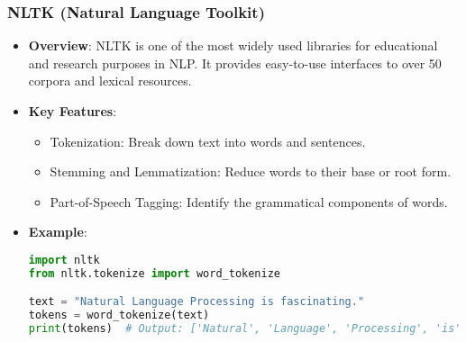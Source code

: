 \documentclass[aspectratio=169]{beamer}
\begin{document}
\begin{frame}[fragile]
    \frametitle{NLTK (Natural Language Toolkit)}
    \begin{itemize}
        \item \textbf{Overview}: NLTK is one of the most widely used libraries for educational and research purposes in NLP. 
        It provides easy-to-use interfaces to over 50 corpora and lexical resources.
        
        \item \textbf{Key Features}:
        \begin{itemize}
            \item Tokenization: Break down text into words and sentences.
            \item Stemming and Lemmatization: Reduce words to their base or root form.
            \item Part-of-Speech Tagging: Identify the grammatical components of words.
        \end{itemize}

        \item \textbf{Example}:
        \begin{lstlisting}[language=Python]
import nltk
from nltk.tokenize import word_tokenize

text = "Natural Language Processing is fascinating."
tokens = word_tokenize(text)
print(tokens)  # Output: ['Natural', 'Language', 'Processing', 'is', 'fascinating', '.']
        \end{lstlisting}
    \end{itemize}
\end{frame}
\end{document}
